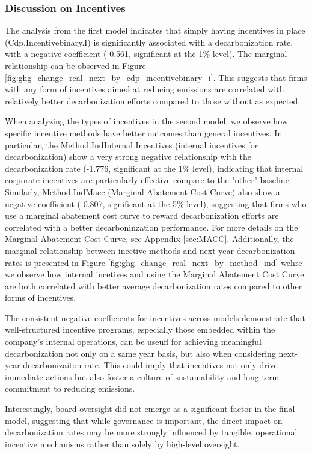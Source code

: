 \subsubsection{Discussion on Incentives}


The analysis from the first model indicates that simply having incentives in place (Cdp.Incentivebinary.I) is significantly associated with a decarbonization rate, with a negative coefficient (-0.561, significant at the 1\% level). The marginal relationship can be observed in Figure \ref{fig:ghg_change_real_next_by_cdp_incentivebinary_i}. This suggests that firms with any form of incentives aimed at reducing emissions are correlated with relatively better decarbonization efforts compared to those without as expected.


When analyzing the types of incentives in the second model, we observe how specific incentive methods have better outcomes than general incentives. In particular, the Method.IndInternal Incentives (internal incentives for decarbonization) show a very strong negative relationship with the decarbonization rate (-1.776, significant at the 1\% level), indicating that internal corporate incentives are particularly effective compare to the "other" baseline. Similarly, Method.IndMacc (Marginal Abatement Cost Curve) also show a negative coefficient (-0.807, significant at the 5\% level), suggesting that firms who use a marginal abatement cost curve to reward decarbonization efforts are correlated with a better decarboninzation performance. For more details on the Marginal Abatement Cost Curve, see Appendix \ref{sec:MACC}. Additionally, the marginal relationship between inective methods and next-year decarbonization rates is presented in Figure \ref{fig:ghg_change_real_next_by_method_ind} wehre we observe how internal incetives and using the Marginal Abatement Cost Curve are both correlated with better average decarbonization rates compared to other forms of incentives.


The consistent negative coefficients for incentives across models demonstrate that well-structured incentive programs, especially those embedded within the company's internal operations, can be useufl  for achieving meaningful decarbonization not only on a same year basis, but also when considering next-year decarbonizaiton rate. This could imply that incentives not only drive immediate actions but also foster a culture of sustainability and long-term commitment to reducing emissions.


Interestingly, board oversight did not emerge as a significant factor in the final model, suggesting that while governance is important, the direct impact on decarbonization rates may be more strongly influenced by tangible, operational incentive mechanisms rather than solely by high-level oversight.


